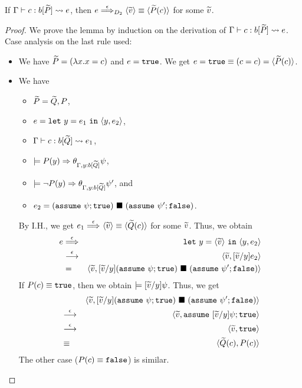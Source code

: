 \begin{lemma}
\label{lem:const}
If \(\Gamma \vdash c : b[\widetilde{P}] \leadsto e\), then
\(e \stackrel{\epsilon}{\Longrightarrow}_{D_2} \langle{\widetilde{v}}\rangle \equiv \langle{\widetilde{P}(c)}\rangle\) for some \(\widetilde{v}\).
\end{lemma}
\begin{proof}
We prove the lemma by induction on the derivation of \(\Gamma \vdash c : b[\widetilde{P}] \leadsto e\).
Case analysis on the last rule used:
\begin{itemize}
\item[] 
We have
\(\widetilde{P}=(\lambda x.x=c)\) and
\(e=\mathtt{true}\).
We get \(e = \mathtt{true} \equiv (c=c)=\langle{\widetilde{P}(c)}\rangle\).


\item[] 
We have
\begin{itemize}
\item \(\widetilde{P}=\widetilde{Q},P\),
\item \(e=\mathtt{let~}y=e_1\mathtt{~in~}{\langle{y,e_2}\rangle}\),
\item \(\Gamma \vdash c : b[\widetilde{Q}] \leadsto e_1\),
\item \(\models P(y) \Rightarrow \theta_{\Gamma,y:b[\widetilde{Q}]}\psi\),
\item \(\models \neg P(y) \Rightarrow \theta_{\Gamma,y:b[\widetilde{Q}]}\psi'\), and
\item \(e_2=(\mathtt{assume~}\psi; \mathtt{true})\ \blacksquare\ (\mathtt{assume~}\psi'; \mathtt{false})\).
\end{itemize}
By I.H., we get \(e_1 \stackrel{\epsilon}{\Longrightarrow}_{} \langle{\widetilde{v}}\rangle \equiv \langle{\widetilde{Q}(c)}\rangle\) for some \(\widetilde{v}\).
Thus, we obtain
\begin{eqnarray*}
e &\stackrel{\epsilon}{\Longrightarrow}_{}& \mathtt{let~}y=\langle{\widetilde{v}}\rangle\mathtt{~in~}{\langle{y,e_2}\rangle} \\
&\stackrel{\epsilon}{\longrightarrow}_{}& \langle{\widetilde{v},[\widetilde{v}/y]e_2}\rangle \\
&=&\langle{\widetilde{v},[\widetilde{v}/y](\mathtt{assume~}\psi; \mathtt{true})\ \blacksquare\ (\mathtt{assume~}\psi'; \mathtt{false})}\rangle
\end{eqnarray*}
If \(P(c) \equiv \mathtt{true}\), then we obtain
\(\models [\widetilde{v}/y]\psi\).
Thus, we get
\begin{eqnarray*}
& &\langle{\widetilde{v},[\widetilde{v}/y](\mathtt{assume~}\psi; \mathtt{true})\ \blacksquare\ (\mathtt{assume~}\psi'; \mathtt{false})}\rangle \\
&\stackrel{\epsilon}{\longrightarrow}_{}&\langle{\widetilde{v},\mathtt{assume~}[\widetilde{v}/y]\psi; \mathtt{true}}\rangle \\
&\stackrel{\epsilon}{\longrightarrow}_{}&\langle{\widetilde{v},\mathtt{true}}\rangle \\
&\equiv&\langle{\widetilde{Q}(c),P(c)}\rangle
\end{eqnarray*}
The other case (\(P(c) \equiv \mathtt{false}\)) is similar.


\end{itemize}
\end{proof}
